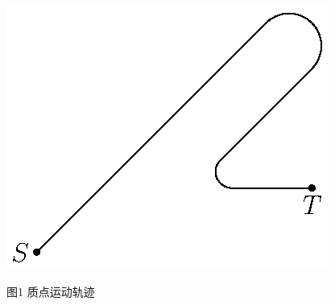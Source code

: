 \documentclass[A4,twoside]{ctexart}
\begin{document}


\newpage
\vspace*{5mm}
\centerline{\includegraphics[viewport=234 339 377 452,clip]{nonhol}}
\vskip 2mm
\centerline{{\footnotesize 图1 \quad 质点运动轨迹}}
\baselineskip
\end{document}
